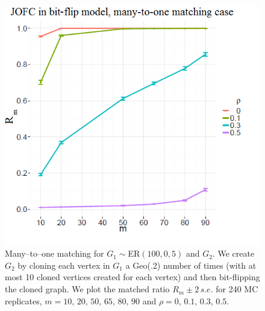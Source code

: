 \documentclass[12pt]{article}
\numberwithin{equation}{section}
\theoremstyle{definition}
\begin{document}
\begin{figure}[h]
\hspace{20mm}
\centering
\includegraphics[width=.6\textwidth]{manytoone.png}
\caption{Many--to--one matching for $G_1\sim$ER$(100,0,5)$ and $G_2$.
    We create $G_2$ by cloning each vertex in $G_1$ a Geo(.2) number of
    times (with at most 10 cloned vertices created for each vertex) and
    then bit-flipping the cloned graph.  We plot the matched ratio
    $R_m\pm 2\,s.e.$ for 240 MC replicates, $m=10,\,20,\,50,\,65,\,80,\,90$ 
    and $\rho=0,\,0.1,\,0.3,\,0.5$. }
\label{fig:fig3}
\end{figure}
\end{document}
